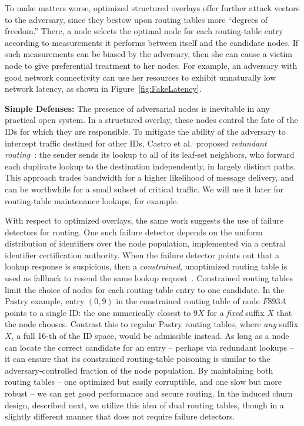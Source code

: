 \documentclass[10pt,twocolumn]{article}
\renewcommand{\paragraph}[1]{\textbf{#1:}}
\begin{document}
To make matters worse, optimized structured overlays offer further attack
vectors to the adversary, since they bestow upon routing tables  more
``degrees of freedom.''  There, a node selects the
optimal node for each routing-table entry according to measurements it
performs between itself and the candidate nodes.  If
such measurements can be biased by the adversary, then she can cause a
victim node to give preferential treatment to her nodes.  For example,
an adversary with good network connectivity can use her
resources to exhibit unnaturally low
network latency, as shown in
Figure~\ref{fig:FakeLatency}.

\paragraph{Simple Defenses} The presence of
adversarial nodes is inevitable in any practical open system.  In a
structured overlay, these nodes control the fate of the IDs for which they are
responsible.  To mitigate the ability of the adversary to intercept
traffic destined for other IDs, Castro et al.\ proposed \emph{redundant routing}~\cite{Castro2002}:
the sender sends its lookup to all of its leaf-set neighbors, who 
forward each duplicate lookup to the destination independently, in largely
distinct paths. This approach trades bandwidth for a higher likelihood of 
message delivery, and can be worthwhile for a small subset of critical traffic. 
We will use it later for routing-table maintenance lookups, for example.

With respect to optimized overlays,
the same work suggests the use of
failure detectors for routing.  One such failure detector depends on the
uniform distribution of identifiers over the node population,
implemented via a central identifier certification authority.  When the
failure detector points out that a lookup response is suspicious, then a
\emph{constrained}, unoptimized routing table is used as fallback to resend
the same lookup request~\cite{Castro2002}.  Constrained routing tables
limit the choice of nodes for each routing-table entry to one candidate.
In the Pastry example, entry $(0,9)$ in the constrained routing table of
node $F893A$ points to a single ID: the one numerically
closest to $9X$ for a \emph{fixed} suffix $X$ that the node chooses.  Contrast
this to regular Pastry routing tables, where \emph{any} suffix $X$, a full
16-th of the ID space, would be admissible instead.  As long as a
node can locate the correct candidate for an 
entry -- perhaps via redundant lookups -- it can ensure that its
constrained routing-table poisoning is similar to the
adversary-controlled fraction of the node population.
By maintaining both routing
tables -- one optimized but easily corruptible, and one slow but more
robust -- we can get
good performance and secure routing.  In the induced churn design, described
next, we utilize this idea of dual routing tables, though in a slightly
different manner that does not require failure detectors.
\end{document}
